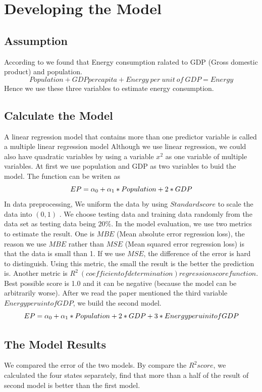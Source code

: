 \documentclass{mcmthesis}
\begin{document}
\section{Developing the Model}
\subsection{Assumption}
According to %
we found that Energy consumption ralated to GDP (Gross domestic product) and population.
$$Population + GDP per capita + Energy\ per\ unit\ of\ GDP = Energy$$
Hence we use these three variables to estimate energy consumption.
\subsection{Calculate the Model}
A linear regression model that contains more than one predictor variable is called a multiple linear regression model %
Although we use linear regression, we could also have quadratic variables by using a variable $x^2$  as one variable of multiple variables.
At first we use population and GDP as two variables to buid the model. The function can be writen as
$$EP = \alpha_0 + \alpha_1 * Population + \label_2 * GDP $$
In data preprocessing, We uniform the data by using $Standard score$ %
to scale the data into $(0,1)$ .
We choose testing data and training data randomly from the data set as testing data being $20\%$. In the model evaluation, we use two metrics to estimate the result.
One is $MBE$ (Mean absolute error regression loss), the reason we use $MBE$ rather than $MSE$ (Mean squared error regression loss) is that the data is small than 1.
If we use $MSE$, the difference of the error is hard to distinguish. Using this metric, the small the result is the better the prediction is.
Another metric is $R^2\ (coefficient of determination) regression score function$.
Best possible score is 1.0 and it can be negative (because the model can be arbitrarily worse).
After we read the paper mentioned the third variable $Energy per uint of GDP$, we build the second model.
$$EP = \alpha_0 + \alpha_1 * Population + \label_2 * GDP + \label_3 * Energy per uinit of GDP $$
\subsection{The Model Results}
We compared the error of the two models. By compare the $R^2 score$, we calculated the four states separately,
find that more than a half of the result of second model is better than the first model. %
\end{document}
